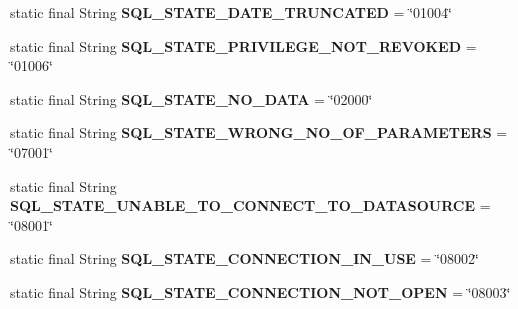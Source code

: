 \begin{DoxyCompactItemize}
static final String {\bfseries S\+Q\+L\+\_\+\+S\+T\+A\+T\+E\+\_\+\+D\+A\+T\+E\+\_\+\+T\+R\+U\+N\+C\+A\+T\+ED} = \char`\"{}01004\char`\"{}
\item 
\mbox{\label{classcom_1_1mysql_1_1cj_1_1exceptions_1_1_mysql_error_numbers_ac2461f198d78a1757cefbc0966a76ffa}} 
static final String {\bfseries S\+Q\+L\+\_\+\+S\+T\+A\+T\+E\+\_\+\+P\+R\+I\+V\+I\+L\+E\+G\+E\+\_\+\+N\+O\+T\+\_\+\+R\+E\+V\+O\+K\+ED} = \char`\"{}01006\char`\"{}
\item 
\mbox{\label{classcom_1_1mysql_1_1cj_1_1exceptions_1_1_mysql_error_numbers_a4f44b95a7145233fd7a94b7d881ce028}} 
static final String {\bfseries S\+Q\+L\+\_\+\+S\+T\+A\+T\+E\+\_\+\+N\+O\+\_\+\+D\+A\+TA} = \char`\"{}02000\char`\"{}
\item 
\mbox{\label{classcom_1_1mysql_1_1cj_1_1exceptions_1_1_mysql_error_numbers_a63b02d449bc6bd2c8c2ef3b350678db3}} 
static final String {\bfseries S\+Q\+L\+\_\+\+S\+T\+A\+T\+E\+\_\+\+W\+R\+O\+N\+G\+\_\+\+N\+O\+\_\+\+O\+F\+\_\+\+P\+A\+R\+A\+M\+E\+T\+E\+RS} = \char`\"{}07001\char`\"{}
\item 
\mbox{\label{classcom_1_1mysql_1_1cj_1_1exceptions_1_1_mysql_error_numbers_a00f13c4d53749e9dacdcd1a2f1d6f831}} 
static final String {\bfseries S\+Q\+L\+\_\+\+S\+T\+A\+T\+E\+\_\+\+U\+N\+A\+B\+L\+E\+\_\+\+T\+O\+\_\+\+C\+O\+N\+N\+E\+C\+T\+\_\+\+T\+O\+\_\+\+D\+A\+T\+A\+S\+O\+U\+R\+CE} = \char`\"{}08001\char`\"{}
\item 
\mbox{\label{classcom_1_1mysql_1_1cj_1_1exceptions_1_1_mysql_error_numbers_a51a18eede43f9dcdaf168a559323433e}} 
static final String {\bfseries S\+Q\+L\+\_\+\+S\+T\+A\+T\+E\+\_\+\+C\+O\+N\+N\+E\+C\+T\+I\+O\+N\+\_\+\+I\+N\+\_\+\+U\+SE} = \char`\"{}08002\char`\"{}
\item 
\mbox{\label{classcom_1_1mysql_1_1cj_1_1exceptions_1_1_mysql_error_numbers_af5c18235d05c1f9275ac42bad8618f74}} 
static final String {\bfseries S\+Q\+L\+\_\+\+S\+T\+A\+T\+E\+\_\+\+C\+O\+N\+N\+E\+C\+T\+I\+O\+N\+\_\+\+N\+O\+T\+\_\+\+O\+P\+EN} = \char`\"{}08003\char`\"{}

\end{DoxyCompactItemize}
